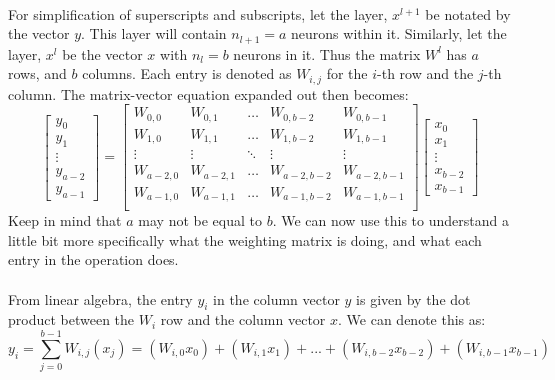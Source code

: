 \documentclass[12pt,letterpaper]{article}
\begin{document}
\paragraph*{}For simplification of superscripts and subscripts, let the layer, $x^{l+1}$ be notated by the vector $y$. This layer will contain $n_{l+1} = a$ neurons within it. Similarly, let the layer, $x^l$ be the vector $x$ with $n_l = b$ neurons in it. Thus the matrix $W^l$ has $a$ rows, and $b$ columns. Each entry is denoted as $W_{i,j}$ for the $i$-th row and the $j$-th column. The matrix-vector equation expanded out then becomes:
\begin{equation}
\label{mat-vec feed}
\begin{bmatrix}
y_0 \\ y_1 \\ \vdots \\ y_{a-2} \\ y_{a-1}
\end{bmatrix} =
\begin{bmatrix}
W_{0,0} & W_{0,1} & \hdots & W_{0,b-2} & W_{0,b-1} \\
W_{1,0} & W_{1,1} & \hdots & W_{1,b-2} & W_{1,b-1} \\
\vdots & \vdots & \ddots & \vdots & \vdots \\
W_{a-2,0} & W_{a-2,1} & \hdots & W_{a-2,b-2} & W_{a-2,b-1} \\
W_{a-1,0} & W_{a-1,1} & \hdots & W_{a-1,b-2} & W_{a-1,b-1} \\
\end{bmatrix}
\begin{bmatrix}
x_0 \\ x_1 \\ \vdots \\ x_{b-2} \\ x_{b-1}
\end{bmatrix}
\end{equation}
Keep in mind that $a$ may not be equal to $b$. We can now use this to understand a little bit more specifically what the weighting matrix is doing, and what each entry in the operation does.
\paragraph*{}From linear algebra, the entry $y_i$ in the column vector $y$ is given by the dot product between the $W_i$ row and the column vector $x$. We can denote this as:
\begin{equation}
\label{dot prod}
y_i = \sum_{j=0}^{b-1} W_{i,j}(x_j) = 
(W_{i,0}x_0) + (W_{i,1}x_1) +  ... + 
(W_{i,b-2}x_{b-2}) + (W_{i,b-1}x_{b-1})
\end{equation}
\end{document}
